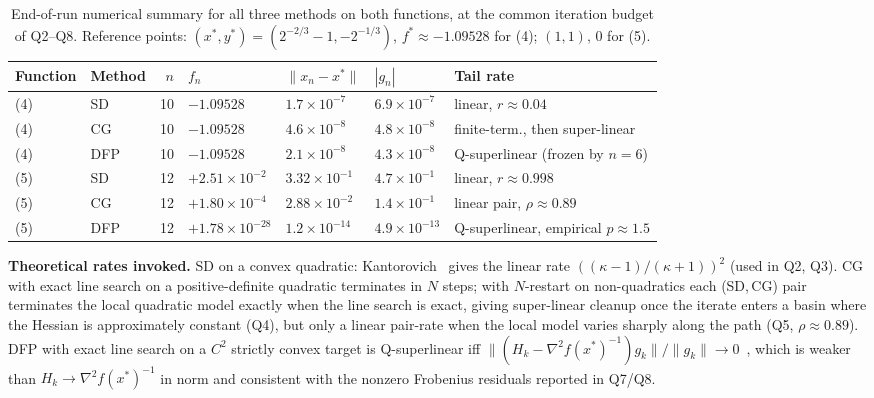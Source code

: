 \documentclass[11pt,a4paper]{article}
\begin{document}
\begin{table}[htbp]
\centering
\caption{End-of-run numerical summary for all three methods on both functions, at the common iteration budget of Q2--Q8. Reference points: \((x^{\ast},y^{\ast})=(2^{-2/3}-1,-2^{-1/3})\), \(f^{\ast}\approx-1.09528\) for (4); \((1,1),\,0\) for (5).}
\label{tab:q9-comparison}
\small
\setlength{\tabcolsep}{4pt}
\begin{tabular}{llrllll}
\toprule
Function & Method & \(n\) & \(f_n\) & \(\|x_n-x^{\ast}\|\) & \(|g_n|\) & Tail rate\\
\midrule
(4) & SD  & 10 & \(-1.09528\)                   & \(1.7\!\times\!10^{-7}\)  & \(6.9\!\times\!10^{-7}\)  & linear, \(r\!\approx\!0.04\)\\
(4) & CG  & 10 & \(-1.09528\)                   & \(4.6\!\times\!10^{-8}\)  & \(4.8\!\times\!10^{-8}\)  & finite-term., then super-linear\\
(4) & DFP & 10 & \(-1.09528\)                   & \(2.1\!\times\!10^{-8}\)  & \(4.3\!\times\!10^{-8}\)  & Q-superlinear (frozen by \(n\!=\!6\))\\
(5) & SD  & 12 & \(+2.51\!\times\!10^{-2}\)     & \(3.32\!\times\!10^{-1}\) & \(4.7\!\times\!10^{-1}\)  & linear, \(r\!\approx\!0.998\)\\
(5) & CG  & 12 & \(+1.80\!\times\!10^{-4}\)     & \(2.88\!\times\!10^{-2}\) & \(1.4\!\times\!10^{-1}\)  & linear pair, \(\rho\!\approx\!0.89\)\\
(5) & DFP & 12 & \(+1.78\!\times\!10^{-28}\)    & \(1.2\!\times\!10^{-14}\) & \(4.9\!\times\!10^{-13}\) & Q-superlinear, empirical \(p\!\approx\!1.5\)\\
\bottomrule
\end{tabular}
\end{table}

\textbf{Theoretical rates invoked.}
SD on a convex quadratic: Kantorovich~\cite{luenberger-ye} gives the linear rate \(((\kappa-1)/(\kappa+1))^{2}\) (used in Q2, Q3). CG with exact line search on a positive-definite quadratic terminates in \(N\) steps; with \(N\)-restart on non-quadratics each (SD,\,CG) pair terminates the local quadratic model exactly when the line search is exact, giving super-linear cleanup once the iterate enters a basin where the Hessian is approximately constant (Q4), but only a linear pair-rate when the local model varies sharply along the path (Q5, \(\rho\approx 0.89\)). DFP with exact line search on a \(C^{2}\) strictly convex target is Q-superlinear iff \(\|(H_k-\nabla^{2}f(x^{\ast})^{-1})g_k\|/\|g_k\|\to 0\)~\cite{dennis-more}, which is weaker than \(H_k\to\nabla^{2}f(x^{\ast})^{-1}\) in norm and consistent with the nonzero Frobenius residuals reported in Q7/Q8.
\end{document}
